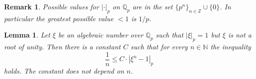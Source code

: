 \documentclass[10pt,a4paper]{amsart}
\newtheorem{remark}{Remark}
\newtheorem{lemma}{Lemma}
\def\N{{\mathbb N}}
\def\Q{{\mathbb Q}}
\def\Z{{\mathbb Z}}
\begin{document}
\begin{remark}\label{thm:possible-values-of-padic-norm}
  Possible values for $|\cdot|_p$ on $\Q_p$ are in the set $\{p^n\}_{n \in \Z} \cup \{0\}$.
  In particular the greatest possible value $<1$ is $1/p$.
\end{remark}

\begin{lemma}\label{thm:padic-log-geq-1/n}
  Let $\xi$ be an algebraic number over $\Q_p$ such that $|\xi|_p = 1$ but $\xi$ is not a root of unity.
  Then there is a constant $C$ such that for every $n \in \N$ the inequality
  \begin{equation}\label{eq:1/n-leq-x-1}
    \frac{1}{n} \leq C \cdot \left| \xi^n - 1 \right|_p
  \end{equation}
  holds. The constant does not depend on $n$.
\end{lemma}
\end{document}
